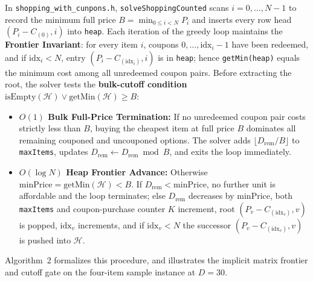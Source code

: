 \documentclass[10pt, a4paper]{article}
\newcommand{\code}[1]{\texttt{\color{primary!90!black}#1}}
\newcommand{\id}[1]{\ensuremath{\mathrm{#1}}}
\begin{document}
In \code{shopping\_with\_cunpons.h}, \code{solveShoppingCounted} scans $i = 0, \ldots, N-1$ to record the minimum full price $B = \min_{0 \le i < N} P_i$ and inserts every row head $(P_i - C_{(0)}, i)$ into \code{heap}. Each iteration of the greedy loop maintains the \textbf{Frontier Invariant}: for every item $i$, coupons $0, \ldots, \id{idx}_i - 1$ have been redeemed, and if $\id{idx}_i < N$, entry $(P_i - C_{(\id{idx}_i)}, i)$ is in \code{heap}; hence \code{getMin(heap)} equals the minimum cost among all unredeemed coupon pairs. Before extracting the root, the solver tests the \textbf{bulk-cutoff condition} $\id{isEmpty}(\mathcal{H}) \lor \id{getMin}(\mathcal{H}) \ge B$:
\begin{itemize}
  \item \textbf{\color{primary}$O(1)$ Bulk Full-Price Termination:} If no unredeemed coupon pair costs strictly less than $B$, buying the cheapest item at full price $B$ dominates all remaining couponed and uncouponed options. The solver adds $\lfloor D_{\text{rem}} / B \rfloor$ to \code{maxItems}, updates $D_{\text{rem}} \gets D_{\text{rem}} \bmod B$, and exits the loop immediately.
  \item \textbf{\color{primary}$O(\log N)$ Heap Frontier Advance:} Otherwise $\id{minPrice} = \id{getMin}(\mathcal{H}) < B$. If $D_{\text{rem}} < \id{minPrice}$, no further unit is affordable and the loop terminates; else $D_{\text{rem}}$ decreases by $\id{minPrice}$, both \code{maxItems} and coupon-purchase counter $K$ increment, root $(P_v - C_{(\id{idx}_v)}, v)$ is popped, $\id{idx}_v$ increments, and if $\id{idx}_v < N$ the successor $(P_v - C_{(\id{idx}_v)}, v)$ is pushed into $\mathcal{H}$.
\end{itemize}
Algorithm~2 formalizes this procedure, and  illustrates the implicit matrix frontier and cutoff gate on the four-item sample instance at $D = 30$.
\end{document}
